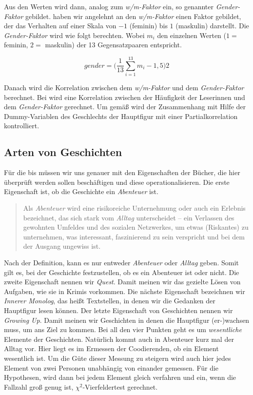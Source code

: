 

Aus den Werten wird dann, analog zum \emph{w/m-Faktor} ein, so genannter
\emph{Gender-Faktor} gebildet. haben wir angelehnt an den
\emph{w/m-Faktor} einen Faktor gebildet, der das Verhalten auf einer
Skala von $-1$ (feminin) bis $1$ (maskulin) darstellt. Die
\emph{Gender-Faktor} wird wie folgt berechten. Wobei $m_i$ den einzelnen
Werten ($1=$ feminin, $2=$ maskulin) der 13 Gegensatzpaaren entspricht.

\begin{equation}
    gender=\Bigg(\frac{1}{13}\sum_{i=1}^{13}m_i-1{,}5\Bigg)2
\end{equation}

Danach wird die Korrelation zwischen dem \emph{w/m-Faktor} und dem
\emph{Gender-Faktor} berechnet. Bei  wird eine Korrelation
zwischen der Häufigkeit der Leserinnen und dem \emph{Gender-Faktor}
gerechnet. Um gemäß  wird der Zusammenhang mit Hilfe der
Dummy-Variablen des Geschlechts der Hauptfigur mit einer
Partialkorrelation kontrolliert.

\subsection{Arten von Geschichten}

Für die  bis  müssen wir uns genauer mit den
Eigenschaften der Bücher, die hier überprüft werden sollen beschäftigen
und diese operationalisieren. Die erste Eigenschaft ist, ob die
Geschichte ein \emph{Abenteuer} ist.
\blockcquote[Hervorhebung P.\,F.]{wiki_abent}{Als \emph{Abenteuer} \textelp{} wird eine risikoreiche Unternehmung oder auch ein Erlebnis bezeichnet, das sich stark vom \emph{Alltag} unterscheidet -- ein Verlassen des gewohnten Umfeldes und des sozialen Netzwerkes, um etwas (Riskantes) zu unternehmen, was interessant, faszinierend zu sein verspricht und bei dem der Ausgang ungewiss ist.}
Nach der Definition, kann es nur entweder \emph{Abenteuer} oder
\emph{Alltag} geben. Somit gilt es, bei der Geschichte festzustellen, ob
es ein Abenteuer ist oder nicht. Die zweite Eigenschaft nennen wir
\emph{Quest}. Damit meinen wir das gezielte Lösen von Aufgaben, wie sie
\zB in Krimis vorkommen. Die nächste Eigenschaft bezeichnen wir
\emph{Innerer Monolog}, das heißt Textstellen, in denen wir die Gedanken
der Hauptfigur lesen können. Der letzte Eigenschaft von Geschichten
nennen wir \emph{Growing Up}. Damit meinen wir Geschichten in denen die
Hauptfigur (er-)wachsen muss, um ans Ziel zu kommen. Bei all den vier
Punkten geht es um \emph{wesentliche} Elemente der Geschichten.
Natürlich kommt auch in Abenteuer kurz mal der Alltag vor. Hier liegt es
im Ermessen der Coodierenden, ob ein Element wesentlich ist. Um die Güte
dieser Messung zu steigern wird auch hier jedes Element von zwei
Personen unabhängig von einander gemessen. Für die Hypothesen, wird dann
bei jedem Element gleich verfahren und ein, wenn die Fallzahl groß genug
ist, $\chi^2$-Vierfeldertest gerechnet.

